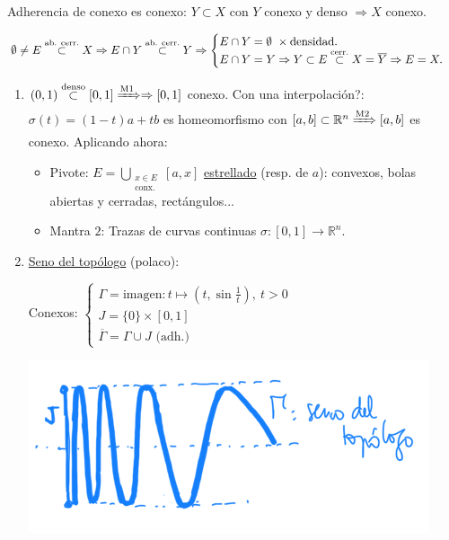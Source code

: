 \begin{prop}[Mantra 3]
Adherencia de conexo es conexo: $Y \subset X$ con $Y$ conexo y denso $\Rightarrow X$ conexo. 
\end{prop}
\begin{demo}
    $\emptyset \neq E \stackrel{\text{ab. cerr.}}{\subset} X \Rightarrow E \cap Y \stackrel{\text{ab. cerr.}}{\subset} Y \Rightarrow \begin{cases}
        E \cap Y = \emptyset\ \times \text{densidad.} \\
        E \cap Y = Y \Rightarrow Y \subset E \stackrel{\text{cerr.}}{\subset} X = \overline{Y} \Rightarrow E = X.
    \end{cases}$
\end{demo}

\begin{ej}
    \begin{enumerate}
        \item $\left( 0, 1 \right) \stackrel{\text{denso}}{\subset} \left[ 0, 1 \right] \xRightarrow{\mathrm{M}1} \Rightarrow \left[ 0, 1 \right]$ conexo. Con una interpolación?: $\sigma\left( t \right) = \left( 1 - t \right) a + tb$ es homeomorfismo con $\left[ a, b \right] \subset \mathbb{R}^n \xRightarrow{\mathrm{M}2} \left[ a, b \right]$ es conexo. Aplicando ahora:
        \begin{itemize}
            \item Pivote: $E = \bigcup_{\substack{x \in E\\ \text{conx.}}} \left[ a, x \right]$ \underline{estrellado} (resp. de $a$): convexos, bolas abiertas y cerradas, rectángulos... 
            \item Mantra $2$: Trazas de curvas continuas $\sigma: \left[ 0, 1 \right] \rightarrow \mathbb{R}^n$.
        \end{itemize}
        \item \underline{Seno del topólogo} (polaco):

        Conexos: $\begin{cases}
            \Gamma = \text{imagen} : t \mapsto \left( t, \sin \frac{1}{t} \right),\ t > 0\\
            J = \{0\} \times \left[ 0, 1 \right]\\
            \overline{\Gamma} = \Gamma \cup J \text{ (adh.)} 
        \end{cases}$
        \begin{center}
            \includegraphics[scale=0.3]{images/seno_topologo} 
        \end{center}
    \end{enumerate}
\end{ej}

